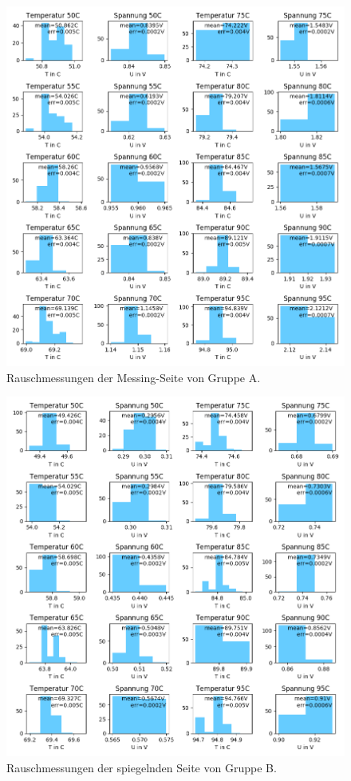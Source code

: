 \documentclass[12pt,a4paper]{article}
\begin{document}
\begin{figure}[H]
\includegraphics[scale=0.8]{Bilder/Rauschen_B_messing_2.png}
\caption{Rauschmessungen der Messing-Seite von Gruppe A.}
\end{figure}

\begin{figure}[H]
\includegraphics[scale=0.8]{Bilder/Rauschen_B_spiegel_2.png}
\caption{Rauschmessungen der spiegelnden Seite von Gruppe B.}
\end{figure}
\end{document}
